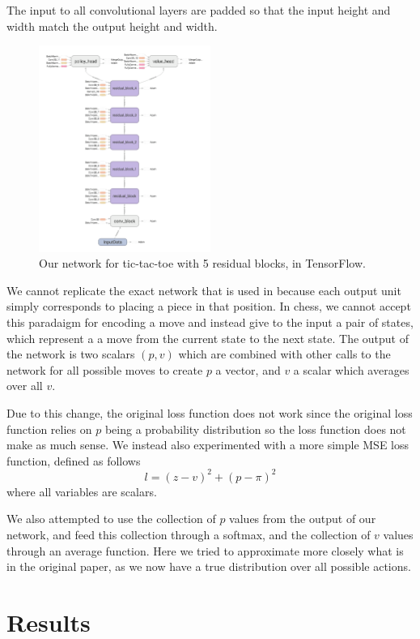 \documentclass[english]{article}
\begin{document}
The input to all convolutional layers are padded so that the input height and
width match the output height and width.

\begin{figure}
	\centering
    \includegraphics[width=0.5\textwidth]{network}
    \caption{Our network for tic-tac-toe with 5 residual blocks, in TensorFlow.}
\end{figure}

We cannot replicate the exact network that is used in \cite{AlphaGo} because
each output unit simply corresponds to placing a piece in that position. In
chess, we cannot accept this paradaigm for encoding a move and instead give to
the input a pair of states, which represent a a move from the current state to
the next state. The output of the network is two scalars $(p, v)$ which are
combined with other calls to the network for all possible moves to create $p$ a
vector, and $v$ a scalar which averages over all $v$.

Due to this change, the original loss function does not work since the original
loss function relies on $p$ being a probability distribution so the loss
function does not make as much sense. We instead also experimented with a more
simple MSE loss function, defined as follows
$$l=(z-v)^2+(p-\pi)^2$$
where all variables are scalars.

We also attempted to use the collection of $p$ values from the output of our
network, and feed this collection through a softmax, and the collection of $v$
values through an average function. Here we tried to approximate more closely
what is in the original paper, as we now have a true distribution over all
possible actions.
\section{Results}
\end{document}
